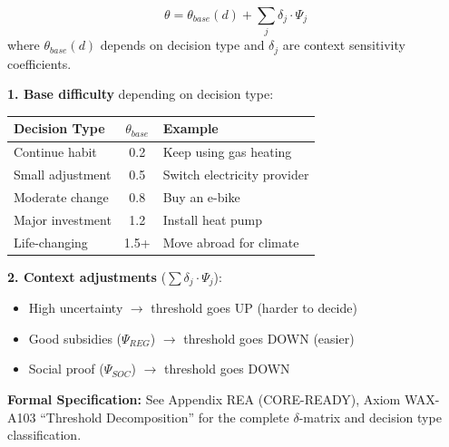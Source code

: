 \begin{definition}
\begin{equation}
\theta = \theta_{base}(d) + \sum_j \delta_j \cdot \Psi_j
\label{eq:theta-decomposition}
\end{equation}
where $\theta_{base}(d)$ depends on decision type and $\delta_j$ are context
sensitivity coefficients.
\end{definition}

\begin{intuition}

\textbf{1. Base difficulty} depending on decision type:

\begin{center}
\begin{tabular}{lcp{5cm}}
\toprule
\textbf{Decision Type} & $\theta_{base}$ & \textbf{Example}\\
\midrule
Continue habit & 0.2 & Keep using gas heating\\
Small adjustment & 0.5 & Switch electricity provider\\
Moderate change & 0.8 & Buy an e-bike\\
Major investment & 1.2 & Install heat pump\\
Life-changing & 1.5+ & Move abroad for climate\\
\bottomrule
\end{tabular}
\end{center}

\textbf{2. Context adjustments} ($\sum \delta_j \cdot \Psi_j$):
\begin{itemize}[nosep]
\item High uncertainty $\rightarrow$ threshold goes UP (harder to decide)
\item Good subsidies ($\Psi_{REG}$) $\rightarrow$ threshold goes DOWN (easier)
\item Social proof ($\Psi_{SOC}$) $\rightarrow$ threshold goes DOWN
\end{itemize}
\end{intuition}

\begin{cross-reference}
\textbf{Formal Specification:} See Appendix REA (CORE-READY), Axiom WAX-A103
``Threshold Decomposition'' for the complete $\delta$-matrix and decision type classification.
\end{cross-reference}



